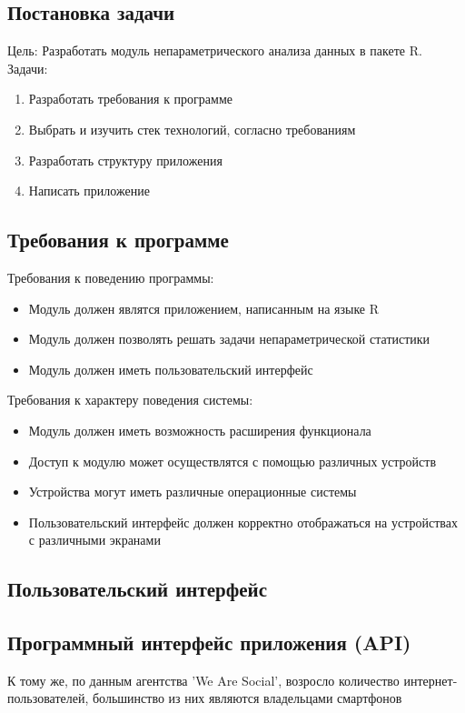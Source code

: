 \documentclass[14pt,a4paper]{scrartcl}
\begin{document}
    \subsection[Постановка задачи]{Постановка задачи}
    Цель: Разработать модуль непараметрического анализа данных в пакете R.\\
    Задачи:
    \begin{enumerate}
        \item Разработать требования к программе
        \item Выбрать и изучить стек технологий, согласно требованиям
        \item Разработать структуру приложения
        \item Написать приложение
    \end{enumerate}

    \subsection[Требования к программе]{Требования к программе}
    Требования к поведению программы:
    \begin{itemize}
        \item Модуль должен являтся приложением, написанным на языке R
        \item Модуль должен позволять решать задачи непараметрической статистики
        \item Модуль должен иметь пользовательский интерфейс
    \end{itemize}
    Требования к характеру поведения системы:
    \begin{itemize}
        \item Модуль должен иметь возможность расширения функционала
        \item Доступ к модулю может осуществлятся с помощью различных устройств
        \item Устройства могут иметь различные операционные системы
        \item Пользовательский интерфейс должен корректно отображаться на устройствах с различными экранами
    \end{itemize}

    \subsection[Пользовательский интерфейс]{Пользовательский интерфейс}
    \subsection[Программный интерфейс приложения]{Программный интерфейс приложения (API)}
    К тому же, по данным агентства 'We Are Social', возросло количество интернет-пользователей, большинство из них являются владельцами смартфонов\cite{Internet-statistic-2018}
\end{document}
